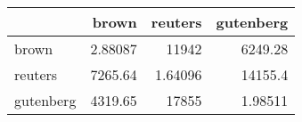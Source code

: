\begin{tabular}{lrrr}
\hline
           &      brown &     reuters &   gutenberg \\
\hline
 brown     &    2.88087 & 11942       &  6249.28    \\
 reuters   & 7265.64    &     1.64096 & 14155.4     \\
 gutenberg & 4319.65    & 17855       &     1.98511 \\
\hline
\end{tabular}